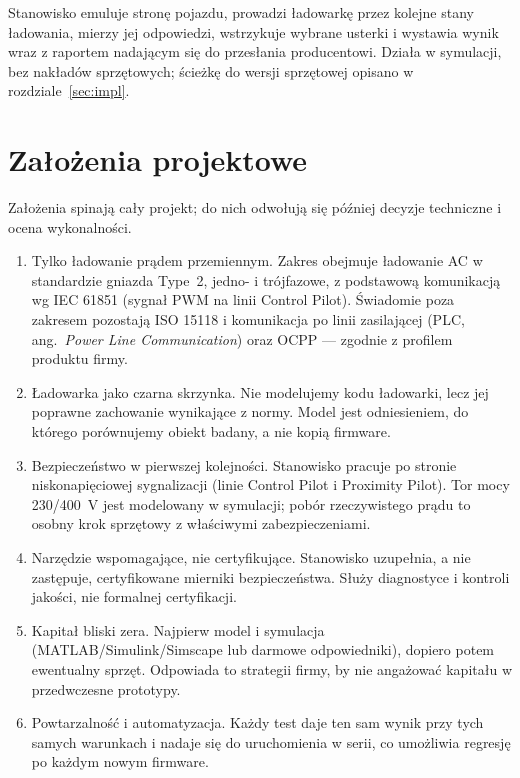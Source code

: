 \documentclass[11pt]{article}
\newcommand{\key}[1]{#1}
\begin{document}
Stanowisko emuluje stronę pojazdu, prowadzi ładowarkę przez kolejne stany ładowania, mierzy jej odpowiedzi, wstrzykuje wybrane usterki i wystawia wynik wraz z raportem nadającym się do przesłania producentowi. Działa w symulacji, bez nakładów sprzętowych; ścieżkę do wersji sprzętowej opisano w rozdziale~\ref{sec:impl}.

\section{Założenia projektowe}\label{sec:zal}

Założenia spinają cały projekt; do nich odwołują się później decyzje techniczne i ocena wykonalności.

\begin{enumerate}
  \item \key{Tylko ładowanie prądem przemiennym.} Zakres obejmuje ładowanie AC w standardzie gniazda Type~2, jedno- i trójfazowe, z podstawową komunikacją wg IEC 61851 (sygnał PWM na linii Control Pilot). Świadomie poza zakresem pozostają ISO 15118 i komunikacja po linii zasilającej (PLC, ang.\ \textit{Power Line Communication}) oraz OCPP --- zgodnie z profilem produktu firmy.
  \item \key{Ładowarka jako czarna skrzynka.} Nie modelujemy kodu ładowarki, lecz jej poprawne zachowanie wynikające z normy. Model jest odniesieniem, do którego porównujemy obiekt badany, a nie kopią firmware.
  \item \key{Bezpieczeństwo w pierwszej kolejności.} Stanowisko pracuje po stronie niskonapięciowej sygnalizacji (linie Control Pilot i Proximity Pilot). Tor mocy 230/400~V jest modelowany w symulacji; pobór rzeczywistego prądu to osobny krok sprzętowy z właściwymi zabezpieczeniami.
  \item \key{Narzędzie wspomagające, nie certyfikujące.} Stanowisko uzupełnia, a nie zastępuje, certyfikowane mierniki bezpieczeństwa. Służy diagnostyce i kontroli jakości, nie formalnej certyfikacji.
  \item \key{Kapitał bliski zera.} Najpierw model i symulacja (MATLAB/Simulink/Simscape lub darmowe odpowiedniki), dopiero potem ewentualny sprzęt. Odpowiada to strategii firmy, by nie angażować kapitału w przedwczesne prototypy.
  \item \key{Powtarzalność i automatyzacja.} Każdy test daje ten sam wynik przy tych samych warunkach i nadaje się do uruchomienia w serii, co umożliwia regresję po każdym nowym firmware.
\end{enumerate}
\end{document}
